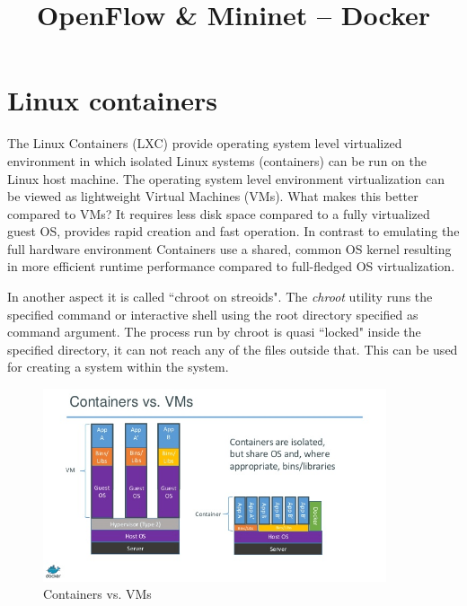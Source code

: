 \documentclass[a4paper]{article}
\title{OpenFlow \& Mininet – Docker}
\author{}
\date{}
\begin{document}
\maketitle

\tableofcontents

\section{Linux containers}
The Linux Containers (LXC) provide operating system level virtualized environment in which isolated Linux systems
(containers) can be run on the Linux host machine. The operating system level environment virtualization can be viewed
as lightweight Virtual Machines (VMs). What makes this better compared to VMs? It requires less disk space compared
to a fully virtualized guest OS, provides rapid creation and fast operation. In contrast to emulating the full hardware
environment Containers use a shared, common OS kernel resulting in more efficient runtime performance compared to
full-fledged OS virtualization.

In another aspect it is called ``chroot on streoids". The \emph{chroot} utility runs the specified command or
interactive shell using the root directory specified as command argument. The process run by chroot is quasi ``locked"
inside the specified directory, it can not reach any of the files outside that. This can be used for creating a system
within the system.

\begin{figure}[H]
    \centering
    \includegraphics[width=0.9\textwidth]{figures/container_vs_vm.png}
    \caption{Containers vs. VMs}
    \label{fig:containers}
\end{figure}
\end{document}
